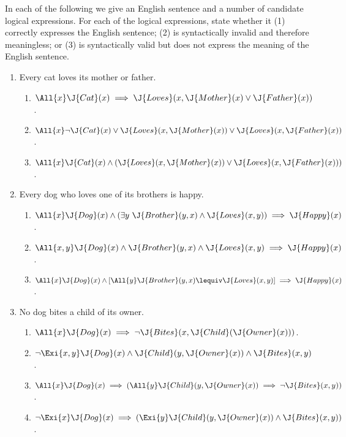 \begin{iexercise}%
In each of the following we give an English 
sentence and a number of candidate logical expressions. For each of
the logical expressions, state whether it
(1) correctly expresses the English sentence; (2) is
syntactically invalid and therefore meaningless; or (3) is syntactically valid
but does not express the meaning of the English sentence. 
\begin{enumerate}
\item  Every cat loves its mother or father.
\begin{enumerate}
  \item \(\All{x} \J{Cat}(x) \implies \J{Loves}(x,\J{Mother}(x)\lor \J{Father}(x))\).
  \item \(\All{x} \lnot \J{Cat}(x) \lor \J{Loves}(x,\J{Mother}(x)) \lor \J{Loves}(x,\J{Father}(x))\).
  \item \(\All{x} \J{Cat}(x) \land (\J{Loves}(x,\J{Mother}(x))\lor \J{Loves}(x,\J{Father}(x)))\).
\end{enumerate}

\item Every dog who loves one of its brothers is happy.
\begin{enumerate}
  \item \(\All{x} \J{Dog}(x) \land (\exists y\ \J{Brother}(y,x) \land \J{Loves}(x,y)) \implies \J{Happy}(x)\).
  \item \(\All{x,y} \J{Dog}(x) \land \J{Brother}(y,x) \land \J{Loves}(x,y) \implies \J{Happy}(x)\).
  \item \(\All{x} \J{Dog}(x) \land [\All{y} \J{Brother}(y,x) \lequiv \J{Loves}(x,y)] \implies \J{Happy}(x)\).
\end{enumerate}

\item No dog bites a child of its owner.
\begin{enumerate}
  \item \(\All{x} \J{Dog}(x) \implies \lnot \J{Bites}(x,\J{Child}(\J{Owner}(x)))\).
  \item \(\lnot \Exi{x,y} \J{Dog}(x) \land \J{Child}(y,\J{Owner}(x)) \land \J{Bites}(x,y)\).
  \item \(\All{x} \J{Dog}(x) \implies (\All{y} \J{Child}(y,\J{Owner}(x)) \implies \lnot \J{Bites}(x,y))\).
  \item \(\lnot \Exi{x} \J{Dog}(x) \implies (\Exi{y} \J{Child}(y,\J{Owner}(x)) \land \J{Bites}(x,y))\).
\end{enumerate}


\end{enumerate}
\end{iexercise}
